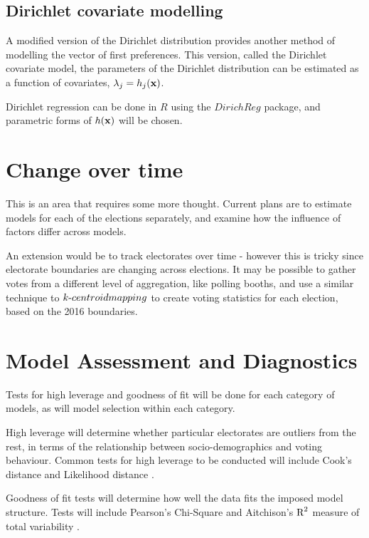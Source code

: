 \documentclass{monashthesis}
\theoremstyle{definition}
\theoremstyle{definition}
\theoremstyle{definition}
\theoremstyle{remark}
\begin{document}
\subsection{Dirichlet covariate
modelling}\label{dirichlet-covariate-modelling}

A modified version of the Dirichlet distribution \autocite{Campbell87}
provides another method of modelling the vector of first preferences.
This version, called the Dirichlet covariate model, the parameters of
the Dirichlet distribution can be estimated as a function of covariates,
\(\lambda_j = h_j({\bf x})\).

Dirichlet regression can be done in \(R\) using the \(DirichReg\)
package, and parametric forms of \(h({\bf x})\) will be chosen.

\section{Change over time}\label{change-over-time}

This is an area that requires some more thought. Current plans are to
estimate models for each of the elections separately, and examine how
the influence of factors differ across models.

An extension would be to track electorates over time - however this is
tricky since electorate boundaries are changing across elections. It may
be possible to gather votes from a different level of aggregation, like
polling booths, and use a similar technique to
\(k{\text -}centroid \space mapping\) to create voting statistics for
each election, based on the 2016 boundaries.

\section{Model Assessment and
Diagnostics}\label{model-assessment-and-diagnostics}

Tests for high leverage and goodness of fit will be done for each
category of models, as will model selection within each category.

High leverage will determine whether particular electorates are outliers
from the rest, in terms of the relationship between socio-demographics
and voting behaviour. Common tests for high leverage to be conducted
will include Cook's distance and Likelihood distance \autocite{RC82}.

Goodness of fit tests will determine how well the data fits the imposed
model structure. Tests will include Pearson's Chi-Square and Aitchison's
\({\text R}^2\) measure of total variability \autocite{JA86}.
\end{document}
